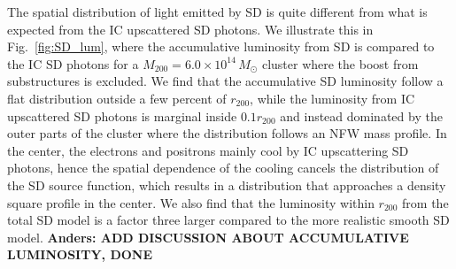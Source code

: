 \documentclass[10pt,aps,pra,reprint,amsmath,amsfonts,amssymb,showpacs,nofootinbib,floatfix]{revtex4-1}
\def\del#1{{}}
\newcommand{\msun}{M_\odot}
\newcommand{\rvir}{r_{200}}
\newcommand{\mvir}{M_{200}}
\begin{document}
The spatial distribution of light emitted by SD is quite different
from what is expected from the IC upscattered SD photons. We
illustrate this in Fig.~\ref{fig:SD_lum}, where the accumulative
luminosity from SD is compared to the IC SD photons for a
$\mvir=6.0\times10^{14}\,\msun$ cluster where the boost from
substructures is excluded. We find that the accumulative SD luminosity
follow a flat distribution outside a few percent of $\rvir$, while the
luminosity from IC upscattered SD photons is marginal inside
$0.1\rvir$ and instead dominated by the outer parts of the cluster
where the distribution follows an NFW mass profile. In the center, the
electrons and positrons mainly cool by IC upscattering SD photons,
hence the spatial dependence of the cooling cancels the distribution
of the SD source function, which results in a distribution that
approaches a density square profile in the center. We also find that
the luminosity within $\rvir$ from the total SD model is a factor
three larger compared to the more realistic smooth SD model. {\bf
  Anders: ADD DISCUSSION ABOUT ACCUMULATIVE LUMINOSITY, DONE}


\del{
found the IR to X-ray luminosity scaling relation found in
\cite{2008A&A...490..547G}. The X-ray luminosities for the clusters
used in this work are listed in the extended HIghest X-ray FLUx Galaxy
Cluster Sample (HIFLUGCS) \cite{2002ApJ...567..716R} from the Rosat
all-sky survey. Note that we have added the Virgo cluster to the
sample that we nevertheless refer to as extended HIFLUGCS catalogue in
the following.
}
\end{document}
